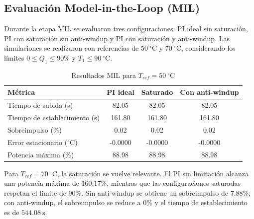 \documentclass[journal]{IEEEtran}
\begin{document}
\subsection{Evaluación Model-in-the-Loop (MIL)}

Durante la etapa MIL se evaluaron tres configuraciones: PI ideal sin
saturación, PI con saturación sin anti-windup y PI con saturación y
anti-windup. Las simulaciones se realizaron con referencias de $50~^\circ$C y
$70~^\circ$C, considerando los límites $0\leq Q_1\leq90\%$ y
$T_1\leq90~^\circ$C.

\begin{table}[H]
        \centering
        \caption{Resultados MIL para $T_{ref}=50~^\circ$C}
        \label{tab:mil_50_v2}
        \renewcommand{\arraystretch}{1.2}
        \begin{tabularx}{\columnwidth}{@{}Yccc@{}}
                \toprule
                \textbf{Métrica} & \textbf{PI ideal} & \textbf{Saturado} & \textbf{Con anti-windup} \\
                \midrule
                Tiempo de subida (s) & 82.05 & 82.05 & 82.05 \\
                Tiempo de establecimiento (s) & 161.80 & 161.80 & 161.80 \\
                Sobreimpulso (\%) & 0.02 & 0.02 & 0.02 \\
                Error estacionario ($^\circ$C) & -0.0000 & -0.0000 & -0.0000 \\
                Potencia máxima (\%) & 88.98 & 88.98 & 88.98 \\
                \bottomrule
        \end{tabularx}
\end{table}

Para $T_{ref}=70~^\circ$C, la saturación se vuelve relevante. El PI sin
limitación alcanza una potencia máxima de $160.17\%$, mientras que las
configuraciones saturadas respetan el límite de $90\%$. Sin anti-windup se
obtiene un sobreimpulso de $7.88\%$; con anti-windup, el sobreimpulso se
reduce a $0\%$ y el tiempo de establecimiento es de $544.08~\mathrm{s}$.
\end{document}
